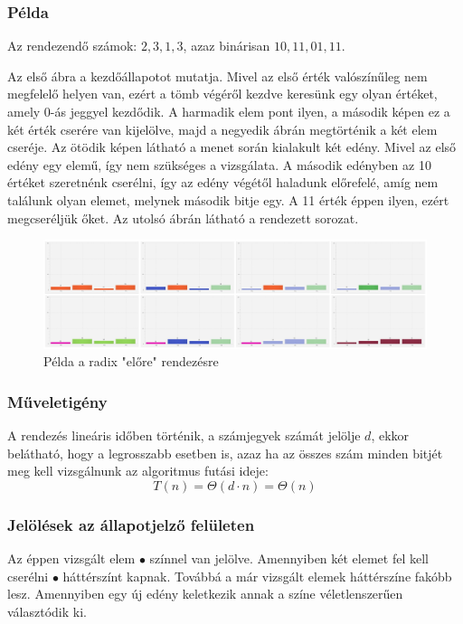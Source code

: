 \documentclass{elteikthesis}
\begin{document}
 \subsubsection{Példa}
 Az rendezendő számok: $2, 3, 1, 3$, azaz binárisan $10, 11, 01, 11$.\par
 Az első ábra a kezdőállapotot mutatja. Mivel az első érték valószínűleg nem megfelelő helyen van, ezért a tömb végéről kezdve keresünk egy olyan értéket, amely 0-ás jeggyel kezdődik. A harmadik elem pont ilyen, a második képen ez a két érték cserére van kijelölve, majd a negyedik ábrán megtörténik a két elem cseréje. Az ötödik képen látható a menet során kialakult két edény. Mivel az első edény egy elemű, így nem szükséges a vizsgálata. A második edényben az 10 értéket szeretnénk cserélni, így az edény végétől haladunk előrefelé, amíg nem találunk olyan elemet, melynek második bitje egy. A 11 érték éppen ilyen, ezért megcseréljük őket. Az utolsó ábrán látható a rendezett sorozat.\par
 \begin{figure}[H]
 	\centering
 	\includegraphics[width=1\textwidth]{pics/radixforward.jpg}
 	\caption{Példa a radix "előre" rendezésre}
 \end{figure}\par
\subsubsection{Műveletigény}
A rendezés lineáris időben történik, a számjegyek számát jelölje $d$, ekkor belátható, hogy a legrosszabb esetben is, azaz ha az összes szám minden bitjét meg kell vizsgálnunk az algoritmus futási ideje:
$$T(n)=\Theta(d \cdot n) = \Theta(n)$$
\subsubsection{Jelölések az állapotjelző felületen}
Az éppen vizsgált elem \textcolor{select}{\Huge$\bullet$} színnel van jelölve. Amennyiben két elemet fel kell cserélni \textcolor{swap}{\Huge$\bullet$} háttérszínt kapnak. Továbbá a már vizsgált elemek háttérszíne fakóbb lesz. Amennyiben egy új edény keletkezik annak a színe véletlenszerűen választódik ki.
\end{document}
